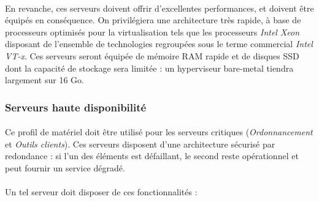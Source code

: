 \paragraph{} En revanche, ces serveurs doivent offrir d'excellentes
performances, et doivent être équipés en conséquence. On privilégiera une
architecture très rapide, à base de processeurs optimisés pour la virtualisation
tels que les processeurs \emph{Intel Xeon} disposant de l'ensemble de
technologies regroupées sous le terme commercial \emph{Intel VT-x}. Ces serveurs
seront équipée de mémoire RAM rapide et de disques SSD dont la capacité de
stockage sera limitée : un hyperviseur bare-metal tiendra largement sur 16 Go.

\subsubsection{Serveurs haute disponibilité}

\paragraph{} Ce profil de matériel doit être utilisé pour les serveurs critiques
(\emph{Ordonnancement} et \emph{Outils clients}). Ces serveurs disposent d'une
architecture sécurisé par redondance : si l'un des éléments est défaillant, le
second reste opérationnel et peut fournir un service dégradé.

\paragraph{} Un tel serveur doit disposer de ces fonctionnalités : 

